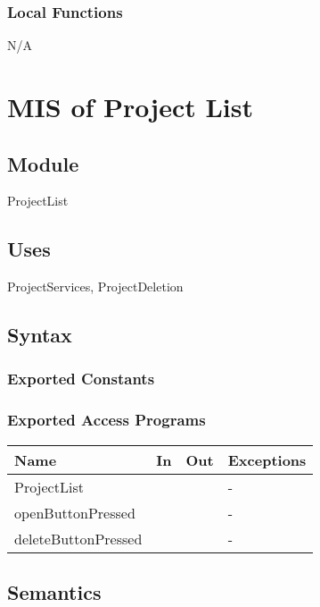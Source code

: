 \documentclass[12pt, titlepage]{article}
\begin{document}
	\subsubsection{Local Functions}
	
	N/A
	
	\newpage
	
	\section{MIS of Project List} \label{Module} 
	
	\subsection{Module}
	
	ProjectList
	
	\subsection{Uses}
	ProjectServices, ProjectDeletion
	
	\subsection{Syntax}
	
	\subsubsection{Exported Constants}
	
	\subsubsection{Exported Access Programs}
	
	\begin{center}
		\begin{tabular}{p{2cm} p{4cm} p{4cm} p{2cm}}
			\hline
			\textbf{Name} & \textbf{In} & \textbf{Out} & \textbf{Exceptions} \\
			\hline
			ProjectList &  &  & - \\
			\hline
			openButtonPressed &  &  & - \\
			\hline
			deleteButtonPressed &  &  & - \\
			\hline
		\end{tabular}
	\end{center}
	
	\subsection{Semantics}
	
\end{document}
